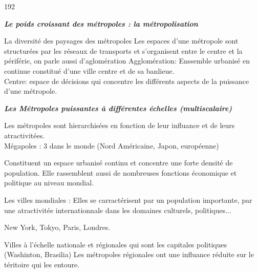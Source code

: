 \documentclass[12pt,a4paper]{article}
\begin{document}
\begin{dingautolist}{192}

\item \textit{\textbf{Le poids croissant des métropoles : la métropolisation}}

\item La diversité des paysages des métropoles 
	Les espaces d'une métropole sont structurées par les réseaux de transports et s'organisent entre le centre et la périférie, on parle aussi d'aglomération
Agglomération: Enssemble urbanisé en continue constitué d'une ville centre et de sa banlieue.\\
Centre: espace de décisions qui concentre les différents aspects de la puissance d'une métropole.\\



\item \textit{\textbf{Les Métropoles puissantes à différentes échelles (multiscalaire)}} 

	Les métropoles sont hierarchisées en fonction de leur influance et de leurs atractivitées.\\
	Mégapoles : 3 dans le monde (Nord Américaine, Japon, européenne)\par
	Constituent un espace urbanisé continu et concentre une forte densité de population. 
	Elle rassemblent aussi de nombreuses fonctions économique et politique au niveau mondial.	

	Les villes mondiales : Elles se carractérisent par un population importante, par une atractivitée internationnale dans les domaines culturels, politiques...\par
New York, Tokyo, Paris, Londres.

Villes à l'échelle nationale et régionales qui sont les capitales politiques (Washinton, Brasilia) Les métropoles régionales ont une influance réduite sur le téritoire qui les entoure.



\end{dingautolist}
\end{document}
